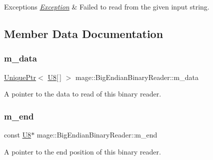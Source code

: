 \begin{DoxyExceptions}{Exceptions}
{\em \hyperlink{classmage_1_1_exception}{Exception}} & Failed to read from the given input string. \\
\hline
\end{DoxyExceptions}


\subsection{Member Data Documentation}
\hypertarget{classmage_1_1_big_endian_binary_reader_a54128bdaa233c1bd20494189b2397fe3}{}\label{classmage_1_1_big_endian_binary_reader_a54128bdaa233c1bd20494189b2397fe3} 
\subsubsection{\texorpdfstring{m\+\_\+data}{m\_data}}
{\footnotesize\ttfamily \hyperlink{namespacemage_a3316d7143a973e37adf1110f2e80ca31}{Unique\+Ptr}$<$ \hyperlink{namespacemage_afc638980bc6154f15af5e2d93a0e0ea9}{U8}\mbox{[}$\,$\mbox{]} $>$ mage\+::\+Big\+Endian\+Binary\+Reader\+::m\+\_\+data\hspace{0.3cm}{\ttfamily [private]}}

A pointer to the data to read of this binary reader. \hypertarget{classmage_1_1_big_endian_binary_reader_ab4f707d30799b98afed0f9adfc27a3e2}{}\label{classmage_1_1_big_endian_binary_reader_ab4f707d30799b98afed0f9adfc27a3e2} 
\subsubsection{\texorpdfstring{m\+\_\+end}{m\_end}}
{\footnotesize\ttfamily const \hyperlink{namespacemage_afc638980bc6154f15af5e2d93a0e0ea9}{U8}$\ast$ mage\+::\+Big\+Endian\+Binary\+Reader\+::m\+\_\+end\hspace{0.3cm}{\ttfamily [private]}}

A pointer to the end position of this binary reader. \hypertarget{classmage_1_1_big_endian_binary_reader_a0f836aec582a59f156b64bffb9653e41}{}\label{classmage_1_1_big_endian_binary_reader_a0f836aec582a59f156b64bffb9653e41} 
